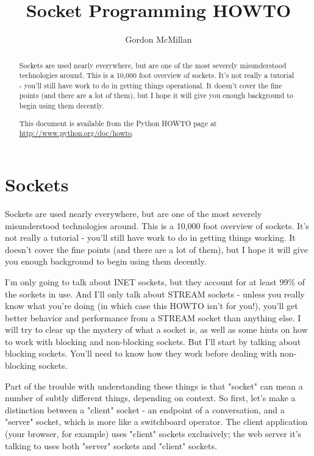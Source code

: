 \documentclass{howto}
\title{Socket Programming HOWTO}
\author{Gordon McMillan}
\begin{document}
\maketitle

\begin{abstract}
\noindent
Sockets are used nearly everywhere, but are one of the most severely
misunderstood technologies around. This is a 10,000 foot overview of
sockets. It's not really a tutorial - you'll still have work to do in
getting things operational. It doesn't cover the fine points (and there
are a lot of them), but I hope it will give you enough background to
begin using them decently.

This document is available from the Python HOWTO page at
\url{http://www.python.org/doc/howto}.

\end{abstract}

\tableofcontents

\section{Sockets}

Sockets are used nearly everywhere, but are one of the most severely
misunderstood technologies around. This is a 10,000 foot overview of
sockets. It's not really a tutorial - you'll still have work to do in
getting things working. It doesn't cover the fine points (and there
are a lot of them), but I hope it will give you enough background to
begin using them decently.

I'm only going to talk about INET sockets, but they account for at
least 99\% of the sockets in use. And I'll only talk about STREAM
sockets - unless you really know what you're doing (in which case this
HOWTO isn't for you!), you'll get better behavior and performance from
a STREAM socket than anything else. I will try to clear up the mystery
of what a socket is, as well as some hints on how to work with
blocking and non-blocking sockets. But I'll start by talking about
blocking sockets. You'll need to know how they work before dealing
with non-blocking sockets.

Part of the trouble with understanding these things is that "socket"
can mean a number of subtly different things, depending on context. So
first, let's make a distinction between a "client" socket - an
endpoint of a conversation, and a "server" socket, which is more like
a switchboard operator. The client application (your browser, for
example) uses "client" sockets exclusively; the web server it's
talking to uses both "server" sockets and "client" sockets.
\end{document}
